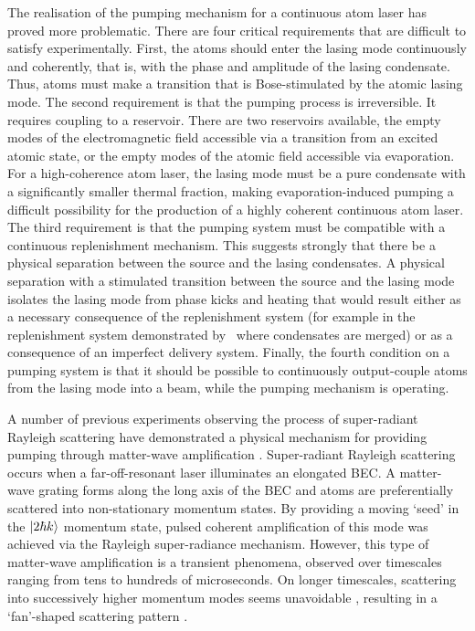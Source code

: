 The realisation of the pumping mechanism for a continuous atom laser has proved more problematic. There are four critical requirements that are difficult to satisfy experimentally.  First, the atoms should enter the lasing mode continuously and coherently, that is, with the phase and amplitude of the lasing condensate.  Thus, atoms must make a transition that is Bose-stimulated by the atomic lasing mode. The second requirement is that the pumping process is irreversible. It requires coupling to a reservoir.  There are two reservoirs available, the empty modes of the electromagnetic field accessible via a transition from an excited atomic state, or the empty modes of the atomic field accessible via evaporation.  For a high-coherence atom laser, the lasing mode must be a pure condensate with a significantly smaller thermal fraction, making evaporation-induced pumping a difficult possibility for the production of a highly coherent continuous atom laser.  The third requirement is that the pumping system must be compatible with a continuous replenishment mechanism.  This suggests strongly that there be a physical separation between the source and the lasing condensates.  A physical separation with a stimulated transition between the source and the lasing mode isolates the lasing mode from phase kicks and heating that would result either as a necessary consequence of the replenishment system (for example in the replenishment system demonstrated by~\citet{Chikkatur:2002qa} where condensates are merged) or as a consequence of an imperfect delivery system.  Finally, the fourth condition on a pumping system is that it should be possible to continuously output-couple atoms from the lasing mode into a beam, while the pumping mechanism is operating.

A number of previous experiments observing the process of super-radiant Rayleigh scattering have demonstrated a physical mechanism for providing pumping through matter-wave amplification \citep{Inouye:1999ph,Kozuma:1999pi}.  Super-radiant Rayleigh scattering occurs when a far-off-resonant laser illuminates an elongated BEC.  A matter-wave grating forms along the long axis of the BEC and atoms are preferentially scattered into non-stationary momentum states.  By providing a moving `seed' in the ${\left|2 \hbar k\right>}$ momentum state, pulsed coherent amplification of this mode was achieved via the Rayleigh super-radiance mechanism.  However, this type of matter-wave amplification is a transient phenomena, observed over timescales ranging from tens \citep{Inouye:1999ph} to hundreds \citep{Kozuma:1999pi} of microseconds.  On longer timescales, scattering into successively higher momentum modes seems unavoidable \citep{Zobay:2006}, resulting in a `fan'-shaped scattering pattern \citep{Inouye:1999yq}.

